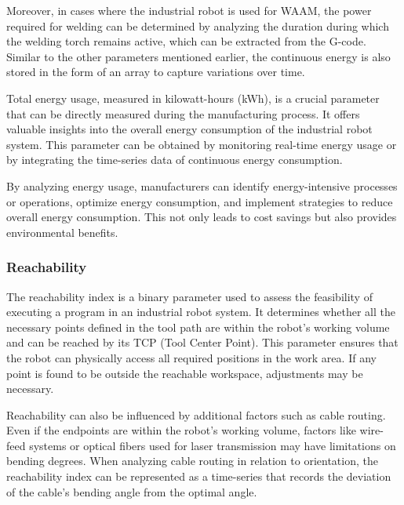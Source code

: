 Moreover, in cases where the industrial robot is used for WAAM, the power required for welding can be determined by analyzing the duration during which the welding torch remains active, which can be extracted from the G-code. Similar to the other parameters mentioned earlier, the continuous energy is also stored in the form of an array to capture variations over time.

Total energy usage, measured in kilowatt-hours (kWh), is a crucial parameter that can be directly measured during the manufacturing process. It offers valuable insights into the overall energy consumption of the industrial robot system. This parameter can be obtained by monitoring real-time energy usage or by integrating the time-series data of continuous energy consumption.

By analyzing energy usage, manufacturers can identify energy-intensive processes or operations, optimize energy consumption, and implement strategies to reduce overall energy consumption. This not only leads to cost savings but also provides environmental benefits.



\subsubsection*{Reachability}
The reachability index is a binary parameter used to assess the feasibility of executing a program in an industrial robot system. It determines whether all the necessary points defined in the tool path are within the robot's working volume and can be reached by its TCP (Tool Center Point). This parameter ensures that the robot can physically access all required positions in the work area. If any point is found to be outside the reachable workspace, adjustments may be necessary.

Reachability can also be influenced by additional factors such as cable routing. Even if the endpoints are within the robot's working volume, factors like wire-feed systems or optical fibers used for laser transmission may have limitations on bending degrees. When analyzing cable routing in relation to orientation, the reachability index can be represented as a time-series that records the deviation of the cable's bending angle from the optimal angle.

